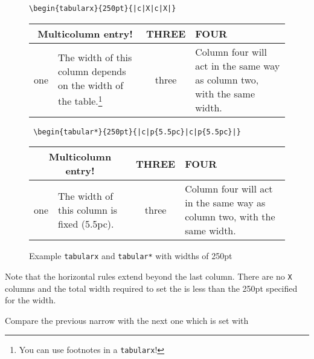 \begin{figure}
\centering
\caption{Example \texttt{tabularx} and \texttt{tabular*} with widths of 250pt}
\verb?\begin{tabularx}{250pt}{|c|X|c|X|}?

 \begin{tabularx}{250pt}{|c|X|c|X|}
 \hline
 \multicolumn{2}{|c|}{Multicolumn entry!}&
 THREE&
 FOUR\\
 \hline
 one&
 \raggedright\arraybackslash The width of this column depends on the
 width of the table.\footnote{You can use footnotes in a \texttt{tabularx}!}
&
 three&
 \raggedright\arraybackslash Column four will act in the same way as
 column two, with the same width.\\
 \hline
 \end{tabularx}
\vspace{\onelineskip}

\verb? \begin{tabular*}{250pt}{|c|p{5.5pc}|c|p{5.5pc}|}? 

 \begin{tabular*}{250pt}{|c|p{5.5pc}|c|p{5.5pc}|}
 \hline
 \multicolumn{2}{|c|}{Multicolumn entry!}&
 THREE&
 FOUR\\
 \hline
 one&
 \raggedright\arraybackslash The width of this column is fixed (5.5pc). &
 three &
 \raggedright\arraybackslash Column four will act in the same way as
 column two, with the same width.\\
 \hline
 \end{tabular*}
\end{figure}

Note that the horizontal rules extend beyond the 
last column.
There are no \texttt{X} columns and the total width required to set
the  is less than the 250pt specified for the width.


Compare the previous narrow  with the next one which is set with 

